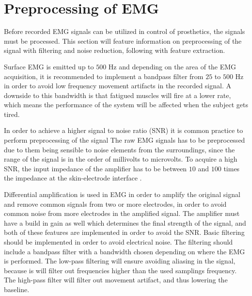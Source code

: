 \section{Preprocessing of EMG}

Before recorded EMG signals can be utilized in control of prosthetics, the signals must be processed. This section will feature information on preprocessing of the signal with filtering and noise reduction, following with feature extraction.

Surface EMG is emitted up to $500$ Hz and depending on the area of the EMG acquisition, it is recommended to implement a bandpass filter from $25$ to $500$ Hz in order to avoid low frequency movement artifacts in the recorded signal. 
A downside to this bandwidth is that fatigued muscles will fire at a lower rate, which means the performance of the system will be affected when the subject gets tired. \cite{cram2012} %

In order to achieve a higher signal to noise ratio (SNR) it is common practice to perform preprocessing of the signal%
The raw EMG signals has to be preprocessed due to them being sensible to noise elements from the surroundings, since the range of the signal is in the order of millivolts to microvolts. To acquire a high SNR, the input impedance of the amplifier has to be between $10$ and $100$ times the impedance at the skin-electrode interface \cite{cram2012}.


Differential amplification is used in EMG in order to amplify the original signal and remove common signals from two or more electrodes, in order to avoid common noise from more electrodes in the amplified signal. The amplifier must have a build in gain as well which determines the final strength of the signal, and both of these features are implemented in order to avoid the SNR. Basic filtering should be implemented in order to avoid electrical noise. 
The filtering should include a bandpass filter with a bandwidth chosen depending on where the EMG is performed. The low-pass filtering will ensure avoiding aliasing in the signal, because is will filter out frequencies higher than the used samplings frequency. The high-pass filter will filter out movement artifact, and thus lowering the baseline. \cite{cram2012}


